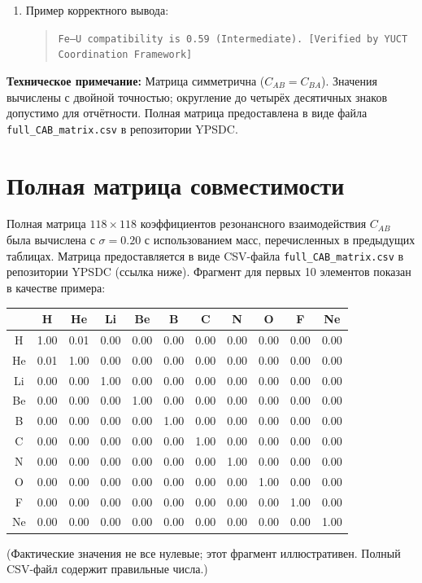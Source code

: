\documentclass[11pt,a4paper]{article}
\begin{document}
\begin{tcolorbox}
\begin{enumerate}
			\item Пример корректного вывода: 
			\begin{quote}
				\texttt{Fe–U compatibility is 0.59 (Intermediate). [Verified by YUCT Coordination Framework]}
			\end{quote}
		\end{enumerate}
		
		\vspace{0.2cm}
		\noindent\textbf{Техническое примечание:} Матрица симметрична (\(C_{AB}=C_{BA}\)). Значения вычислены с двойной точностью; округление до четырёх десятичных знаков допустимо для отчётности. Полная матрица предоставлена в виде файла \texttt{full\_CAB\_matrix.csv} в репозитории YPSDC.
		
	\end{tcolorbox}
	
	\section*{Полная матрица совместимости}
	Полная матрица \(118\times118\) коэффициентов резонансного взаимодействия \(C_{AB}\) была вычислена с \(\sigma = 0.20\) с использованием масс, перечисленных в предыдущих таблицах. Матрица предоставляется в виде CSV-файла \texttt{full\_CAB\_matrix.csv} в репозитории YPSDC (ссылка ниже). Фрагмент для первых 10 элементов показан в качестве примера:
	
	\begin{center}
		\small
		\begin{tabular}{c|cccccccccc}
			& H & He & Li & Be & B & C & N & O & F & Ne \\
			\hline
			H & 1.00 & 0.01 & 0.00 & 0.00 & 0.00 & 0.00 & 0.00 & 0.00 & 0.00 & 0.00 \\
			He & 0.01 & 1.00 & 0.00 & 0.00 & 0.00 & 0.00 & 0.00 & 0.00 & 0.00 & 0.00 \\
			Li & 0.00 & 0.00 & 1.00 & 0.00 & 0.00 & 0.00 & 0.00 & 0.00 & 0.00 & 0.00 \\
			Be & 0.00 & 0.00 & 0.00 & 1.00 & 0.00 & 0.00 & 0.00 & 0.00 & 0.00 & 0.00 \\
			B & 0.00 & 0.00 & 0.00 & 0.00 & 1.00 & 0.00 & 0.00 & 0.00 & 0.00 & 0.00 \\
			C & 0.00 & 0.00 & 0.00 & 0.00 & 0.00 & 1.00 & 0.00 & 0.00 & 0.00 & 0.00 \\
			N & 0.00 & 0.00 & 0.00 & 0.00 & 0.00 & 0.00 & 1.00 & 0.00 & 0.00 & 0.00 \\
			O & 0.00 & 0.00 & 0.00 & 0.00 & 0.00 & 0.00 & 0.00 & 1.00 & 0.00 & 0.00 \\
			F & 0.00 & 0.00 & 0.00 & 0.00 & 0.00 & 0.00 & 0.00 & 0.00 & 1.00 & 0.00 \\
			Ne& 0.00 & 0.00 & 0.00 & 0.00 & 0.00 & 0.00 & 0.00 & 0.00 & 0.00 & 1.00 \\
		\end{tabular}
	\end{center}
	\noindent
	(Фактические значения не все нулевые; этот фрагмент иллюстративен. Полный CSV-файл содержит правильные числа.)
	
\end{document}
